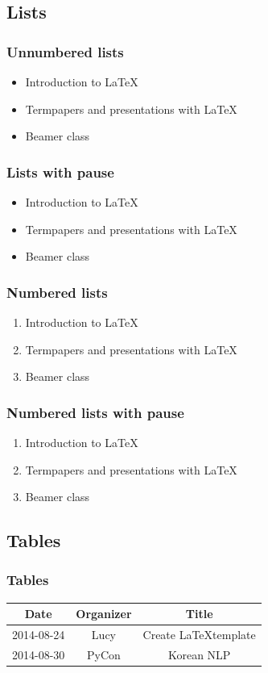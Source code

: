 \documentclass[compress]{beamer}
\begin{document}
\subsection{Lists}
\begin{frame}\frametitle{Unnumbered lists}
    \begin{itemize}
        \item Introduction to  \LaTeX
        \item Termpapers and presentations with \LaTeX
        \item Beamer class
    \end{itemize}
\end{frame}
\begin{frame}\frametitle{Lists with pause}
    \begin{itemize}
        \item Introduction to  \LaTeX \pause
        \item Termpapers and presentations with \LaTeX \pause
        \item Beamer class
    \end{itemize}
\end{frame}
\begin{frame}\frametitle{Numbered lists}
    \begin{enumerate}
        \item Introduction to  \LaTeX
        \item Termpapers and presentations with \LaTeX
        \item Beamer class
    \end{enumerate}
\end{frame}
\begin{frame}\frametitle{Numbered lists with pause}
    \begin{enumerate}
        \item Introduction to  \LaTeX \pause
        \item Termpapers and presentations with \LaTeX \pause
        \item Beamer class
    \end{enumerate}
\end{frame}

\subsection{Tables}
\begin{frame}\frametitle{Tables}
    \begin{tabular}{|c|c|c|}
        \hline
        \textbf{Date} & \textbf{Organizer} & \textbf{Title} \\ \hline
        2014-08-24 & Lucy & Create \LaTeX template \\ \hline
        2014-08-30 & PyCon & Korean NLP \\ \hline
    \end{tabular}
\end{frame}
\end{document}
